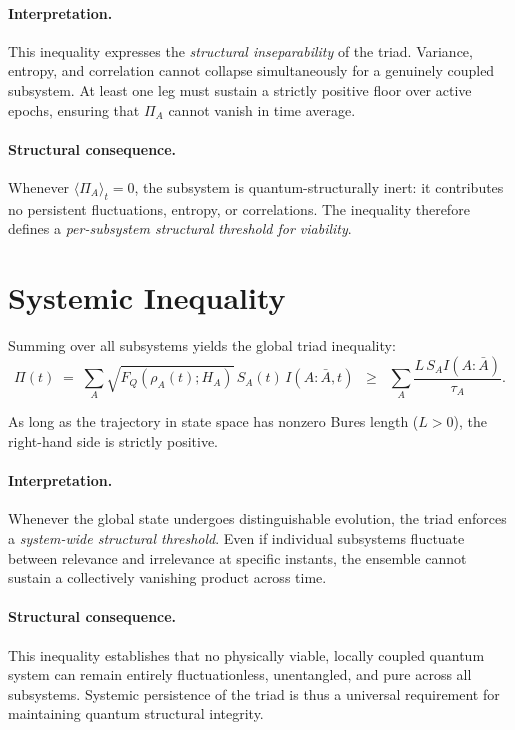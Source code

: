 \documentclass[10pt]{article}
\begin{document}
\paragraph{Interpretation.}
This inequality expresses the \emph{structural inseparability} of the triad. Variance, entropy, and
correlation cannot collapse simultaneously for a genuinely coupled subsystem. At least one leg must
sustain a strictly positive floor over active epochs, ensuring that $\Pi_A$ cannot vanish in time average.

\paragraph{Structural consequence.}
Whenever $\langle \Pi_A \rangle_t = 0$, the subsystem is quantum-structurally inert: it contributes no
persistent fluctuations, entropy, or correlations. The inequality therefore defines a \emph{per-subsystem
structural threshold for viability}.
\section{Systemic Inequality}

Summing over all subsystems yields the global triad inequality:
\begin{equation}
\Pi(t) \;=\; \sum_{A} \sqrt{F_Q(\rho_A(t); H_A)} \, S_A(t) \, I(A:\bar{A},t)
\;\;\geq\;\; \sum_{A} \frac{L \, S_A I(A:\bar{A})}{\tau_A}.
\end{equation}

As long as the trajectory in state space has nonzero Bures length ($L>0$), the right-hand side is
strictly positive.

\paragraph{Interpretation.}
Whenever the global state undergoes distinguishable evolution, the triad enforces a \emph{system-wide
structural threshold}. Even if individual subsystems fluctuate between relevance and irrelevance at
specific instants, the ensemble cannot sustain a collectively vanishing product across time.

\paragraph{Structural consequence.}
This inequality establishes that no physically viable, locally coupled quantum system can remain
entirely fluctuationless, unentangled, and pure across all subsystems. Systemic persistence of the
triad is thus a universal requirement for maintaining quantum structural integrity.
\end{document}
